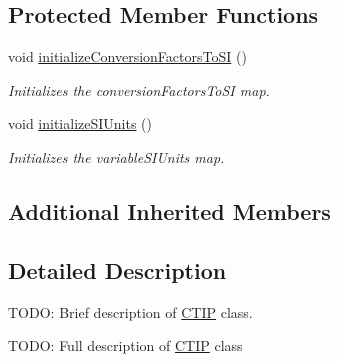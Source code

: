 \subsection*{Protected Member Functions}
\begin{DoxyCompactItemize}
\item 
void \hyperlink{classccmc_1_1_c_t_i_p_a082ab812295cbbbd31a8a60d723ca518}{initialize\-Conversion\-Factors\-To\-S\-I} ()
\begin{DoxyCompactList}\small\item\em Initializes the conversion\-Factors\-To\-S\-I map. \end{DoxyCompactList}\item 
void \hyperlink{classccmc_1_1_c_t_i_p_abcd6a28de17688978f7cee2e7798f9e8}{initialize\-S\-I\-Units} ()
\begin{DoxyCompactList}\small\item\em Initializes the variable\-S\-I\-Units map. \end{DoxyCompactList}\end{DoxyCompactItemize}
\subsection*{Additional Inherited Members}


\subsection{Detailed Description}
T\-O\-D\-O\-: Brief description of \hyperlink{classccmc_1_1_c_t_i_p}{C\-T\-I\-P} class. 

T\-O\-D\-O\-: Full description of \hyperlink{classccmc_1_1_c_t_i_p}{C\-T\-I\-P} class 

